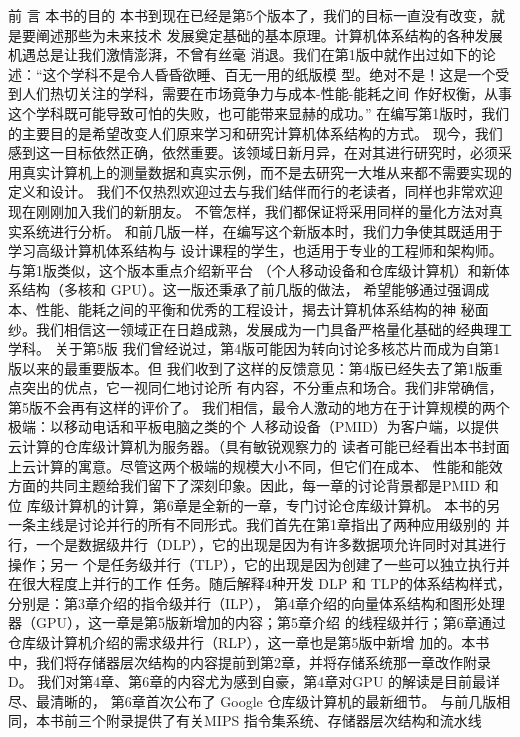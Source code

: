 前
言
本书的目的
本书到现在已经是第5个版本了，我们的目标一直没有改变，就是要阐述那些为未来技术
发展奠定基础的基本原理。计算机体系结构的各种发展机遇总是让我们激情澎湃，不曾有丝毫
消退。我们在第1版中就作出过如下的论述：“这个学科不是令人昏昏欲睡、百无一用的纸版模
型。绝对不是！这是一个受到人们热切关注的学科，需要在市场竟争力与成本-性能-能耗之间
作好权衡，从事这个学科既可能导致可怕的失败，也可能带来显赫的成功。”
在编写第1版时，我们的主要目的是希望改变人们原来学习和研究计算机体系结构的方式。
现今，我们感到这一目标依然正确，依然重要。该领域日新月异，在对其进行研究时，必须采
用真实计算机上的测量数据和真实示例，而不是去研究一大堆从来都不需要实现的定义和设计。
我们不仅热烈欢迎过去与我们结伴而行的老读者，同样也非常欢迎现在刚刚加入我们的新朋友。
不管怎样，我们都保证将采用同样的量化方法对真实系统进行分析。
和前几版一样，在编写这个新版本时，我们力争使其既适用于学习高级计算机体系结构与
设计课程的学生，也适用于专业的工程师和架构师。与第1版类似，这个版本重点介绍新平台
（个人移动设备和仓库级计算机）和新体系结构（多核和 GPU）。这一版还秉承了前几版的做法，
希望能够通过强调成本、性能、能耗之间的平衡和优秀的工程设计，揭去计算机体系结构的神
秘面纱。我们相信这一领域正在日趋成熟，发展成为一门具备严格量化基础的经典理工学科。
关于第5版
我们曾经说过，第4版可能因为转向讨论多核芯片而成为自第1版以来的最重要版本。但
我们收到了这样的反馈意见：第4版已经失去了第1版重点突出的优点，它一视同仁地讨论所
有内容，不分重点和场合。我们非常确信，第5版不会再有这样的评价了。
我们相信，最令人激动的地方在于计算规模的两个极端：以移动电话和平板电脑之类的个
人移动设备（PMID）为客户端，以提供云计算的仓库级计算机为服务器。（具有敏锐观察力的
读者可能已经看出本书封面上云计算的寓意。尽管这两个极端的规模大小不同，但它们在成本、
性能和能效方面的共同主题给我们留下了深刻印象。因此，每一章的讨论背景都是PMID 和位
库级计算机的计算，第6章是全新的一章，专门讨论仓库级计算机。
本书的另一条主线是讨论并行的所有不同形式。我们首先在第1章指出了两种应用级别的
并行，一个是数据级井行（DLP），它的出现是因为有许多数据项允许同时对其进行操作；另一
个是任务级并行（TLP），它的出现是因为创建了一些可以独立执行并在很大程度上并行的工作
任务。随后解释4种开发 DLP 和 TLP的体系结构样式，分别是：第3章介绍的指令级并行（ILP），
第4章介绍的向量体系结构和图形处理器（GPU），这一章是第5版新增加的内容；第5章介绍
的线程级并行；第6章通过仓库级计算机介绍的需求级井行（RLP），这一章也是第5版中新增
加的。本书中，我们将存储器层次结构的内容提前到第2章，并将存储系统那一章改作附录D。
我们对第4章、第6章的内容尤为感到自豪，第4章对GPU 的解读是目前最详尽、最清晰的，
第6章首次公布了 Google 仓库级计算机的最新细节。
与前几版相同，本书前三个附录提供了有关MIPS 指令集系统、存储器层次结构和流水线
